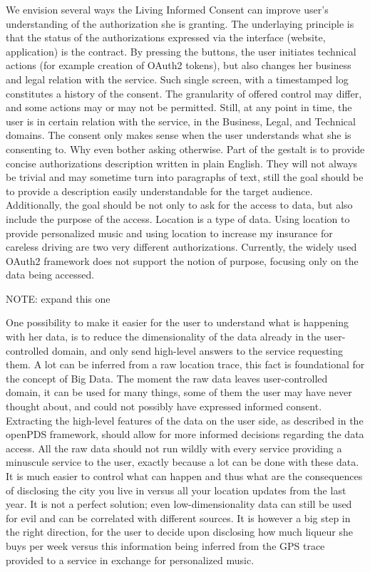 We envision several ways the Living Informed Consent can improve user's understanding of the authorization she is granting. 
The underlaying principle is that the status of the authorizations expressed via the interface (website, application) is the contract.
By pressing the buttons, the user initiates technical actions (for example creation of OAuth2 tokens), but also changes her business and legal relation with the service.
Such single screen, with a timestamped log constitutes a history of the consent. 
The granularity of offered control may differ, and some actions may or may not be permitted.
Still, at any point in time, the user is in certain relation with the service, in the Business, Legal, and Technical domains. 
The consent only makes sense when the user understands what she is consenting to.
Why even bother asking otherwise.
Part of the gestalt is to provide concise authorizations description written in plain English.
They will not always be trivial and may sometime turn into paragraphs of text, still the goal should be to provide a description easily understandable for the target audience.
Additionally, the goal should be not only to ask for the access to data, but also include the purpose of the access.
Location is a type of data. Using location to provide personalized music and using location to increase my insurance for careless driving are two very different authorizations.
Currently, the widely used OAuth2 framework does not support the notion of purpose, focusing only on the data being accessed.

NOTE: expand this one

One possibility to make it easier for the user to understand what is happening with her data, is to reduce the dimensionality of the data already in the user-controlled domain, and only send high-level answers to the service requesting them.
A lot can be inferred from a raw location trace, this fact is foundational for the concept of Big Data.
The moment the raw data leaves user-controlled domain, it can be used for many things, some of them the user may have never thought about, and could not possibly have expressed informed consent.
Extracting the high-level features of the data on the user side, as described in the openPDS framework, should allow for more informed decisions regarding the data access.
All the raw data should not run wildly with every service providing a minuscule service to the user, exactly because a lot can be done with these data.
It is much easier to control what can happen and thus what are the consequences of disclosing the city you live in versus all your location updates from the last year.
It is not a perfect solution; even low-dimensionality data can still be used for evil and can be correlated with different sources.
It is however a big step in the right direction, for the user to decide upon disclosing how much liqueur she buys per week versus this information being inferred from the GPS trace provided to a service in exchange for personalized music. 

